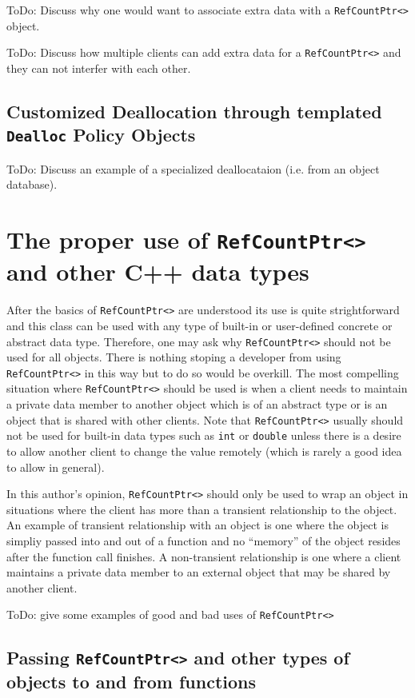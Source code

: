 ToDo: Discuss why one would want to associate extra data with a \texttt{RefCountPtr<>}
object.

ToDo: Discuss how multiple clients can add extra data for a \texttt{RefCountPtr<>}
and they can not interfer with each other.

%
\subsection{Customized Deallocation through templated \texttt{Dealloc} Policy Objects}
%

ToDo: Discuss an example of a specialized deallocataion (i.e. from an
object database).


%
\section{The proper use of \texttt{RefCountPtr<>} and other C++ data types}
%

After the basics of \texttt{RefCountPtr<>} are understood its use is
quite strightforward and this class can be used with any type of
built-in or user-defined concrete or abstract data type.  Therefore,
one may ask why \texttt{RefCountPtr<>} should not be used for all
objects.  There is nothing stoping a developer from using
\texttt{RefCountPtr<>} in this way but to do so would be overkill.
The most compelling situation where \texttt{RefCountPtr<>} should be
used is when a client needs to maintain a private data member to
another object which is of an abstract type or is an object that is
shared with other clients.  Note that \texttt{RefCountPtr<>} usually
should not be used for built-in data types such as \texttt{int} or
\texttt{double} unless there is a desire to allow another client to
change the value remotely (which is rarely a good idea to allow in
general).

In this author's opinion, \texttt{RefCountPtr<>} should only be used
to wrap an object in situations where the client has more than a
transient relationship to the object.  An example of transient
relationship with an object is one where the object is simpliy passed
into and out of a function and no ``memory'' of the object resides
after the function call finishes.  A non-transient relationship is one
where a client maintains a private data member to an external object
that may be shared by another client.

ToDo: give some examples of good and bad uses of \texttt{RefCountPtr<>}

%
\subsection{Passing \texttt{RefCountPtr<>} and other types of objects to and from functions}
%

